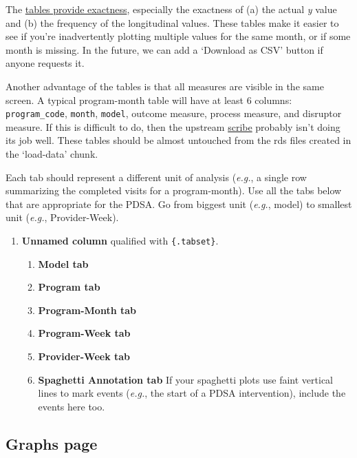 \documentclass[
]{book}
\providecommand{\tightlist}{%
  \setlength{\itemsep}{0pt}\setlength{\parskip}{0pt}}
\begin{document}
The \href{https://ouhscbbmc.github.io/data-science-practices-1/dashboard-1.html\#tables}{tables provide exactness}, especially the exactness of (a) the actual \emph{y} value and (b) the frequency of the longitudinal values. These tables make it easier to see if you're inadvertently plotting multiple values for the same month, or if some month is missing. In the future, we can add a `Download as CSV' button if anyone requests it.

Another advantage of the tables is that all measures are visible in the same screen. A typical program-month table will have at least 6 columns: \texttt{program\_code}, \texttt{month}, \texttt{model}, outcome measure, process measure, and disruptor measure. If this is difficult to do, then the upstream \protect\hyperlink{pattern-scribe}{scribe} probably isn't doing its job well. These tables should be almost untouched from the rds files created in the `load-data' chunk.

Each tab should represent a different unit of analysis (\emph{e.g.}, a single row summarizing the completed visits for a program-month). Use all the tabs below that are appropriate for the PDSA. Go from biggest unit (\emph{e.g.}, model) to smallest unit (\emph{e.g.}, Provider-Week).

\begin{enumerate}
\def\labelenumi{\arabic{enumi}.}
\item
  \textbf{Unnamed column} qualified with \texttt{\{.tabset\}}.

  \begin{enumerate}
  \def\labelenumii{\arabic{enumii}.}
  \tightlist
  \item
    \textbf{Model tab}
  \item
    \textbf{Program tab}
  \item
    \textbf{Program-Month tab}
  \item
    \textbf{Program-Week tab}
  \item
    \textbf{Provider-Week tab}
  \item
    \textbf{Spaghetti Annotation tab} If your spaghetti plots use faint vertical lines to mark events (\emph{e.g.}, the start of a PDSA intervention), include the events here too.
  \end{enumerate}
\end{enumerate}

\hypertarget{graphs-page}{%
\subsection{Graphs page}\label{graphs-page}}
\end{document}
